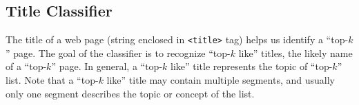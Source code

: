 \subsection{Title Classifier}
\label{sec:title}
%

The title of a web page (string enclosed in {\tt<title>} tag) 
helps us identify a ``top-$k$'' page.
The goal of the classifier is to recognize ``top-$k$ like'' titles, 
the likely name of a ``top-$k$'' page. In general, 
a ``top-$k$ like'' title represents the topic of ``top-$k$'' list.
Note that a ``top-$k$ like'' title may contain multiple segments, and
usually only one segment describes the topic or concept of the list.




